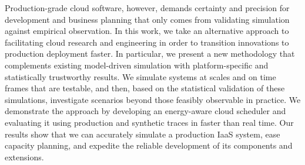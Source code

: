  Production-grade  cloud software,  however, demands  certainty and  precision for  development and  business
planning  that   only  comes   from  validating  simulation   against  empirical
observation.   In this  work, we  take an  alternative approach  to facilitating
cloud research and engineering in  order to transition innovations to production
deployment faster.  In particular, we present a new methodology that complements
existing  model-driven  simulation   with  platform-specific  and  statistically
trustworthy results.  We simulate systems at  scales and on time frames that are
testable, and  then, based on  the statistical validation of  these simulations,
investigate  scenarios   beyond  those  feasibly  observable   in  practice.  We
demonstrate  the approach  by  developing an  energy-aware  cloud scheduler  and
evaluating it  using production and synthetic  traces in faster than  real time.
Our results show that we can  accurately simulate a production IaaS system, ease
capacity planning, and  expedite the reliable development of  its components and
extensions.
